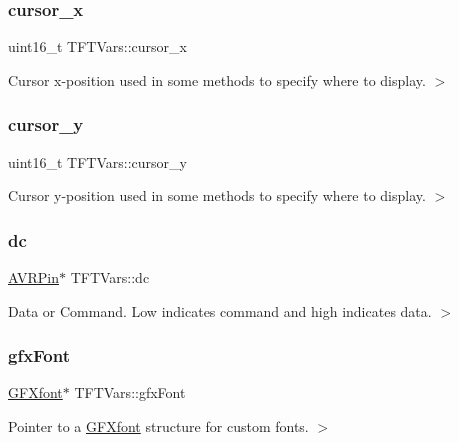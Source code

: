 \subsubsection{\texorpdfstring{cursor\+\_\+x}{cursor\_x}}
{\footnotesize\ttfamily uint16\+\_\+t T\+F\+T\+Vars\+::cursor\+\_\+x}

Cursor x-\/position used in some methods to specify where to display. $>$ \mbox{\label{struct_t_f_t_vars_a41e7f18038ce1a39bb39bb8cc912dcfa}} 
\subsubsection{\texorpdfstring{cursor\+\_\+y}{cursor\_y}}
{\footnotesize\ttfamily uint16\+\_\+t T\+F\+T\+Vars\+::cursor\+\_\+y}

Cursor y-\/position used in some methods to specify where to display. $>$ \mbox{\label{struct_t_f_t_vars_a9e9fa6cfe200a6ded2303e583e0f3868}} 
\subsubsection{\texorpdfstring{dc}{dc}}
{\footnotesize\ttfamily \mbox{\hyperlink{struct_a_v_r_pin}{A\+V\+R\+Pin}}$\ast$ T\+F\+T\+Vars\+::dc}

Data or Command. Low indicates command and high indicates data. $>$ \mbox{\label{struct_t_f_t_vars_a626dbe8464c13404897e1c74254104dd}} 
\subsubsection{\texorpdfstring{gfx\+Font}{gfxFont}}
{\footnotesize\ttfamily \mbox{\hyperlink{struct_g_f_xfont}{G\+F\+Xfont}}$\ast$ T\+F\+T\+Vars\+::gfx\+Font}

Pointer to a \mbox{\hyperlink{struct_g_f_xfont}{G\+F\+Xfont}} structure for custom fonts. $>$ \mbox{\label{struct_t_f_t_vars_ab3f585ae776704ad0585c12491596ed4}} 
